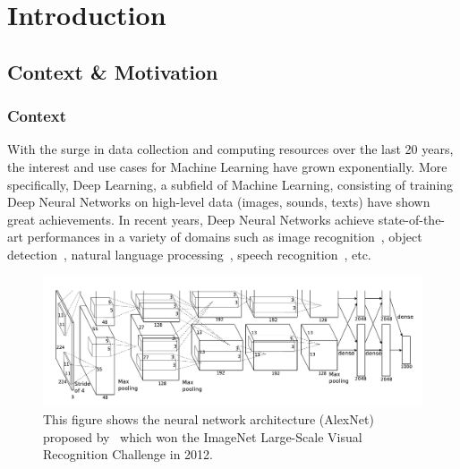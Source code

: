 \chapter{Introduction}
\label{chapter:introduction}
\localtableofcontents

\section{Context \& Motivation}
\label{section:ch1-context_and_motivation}

\subsection{Context}
\label{subsection:ch1-context}

With the surge in data collection and computing resources over the last 20 years, the interest and use cases for Machine Learning have grown exponentially.
More specifically, Deep Learning, a subfield of Machine Learning, consisting of training Deep Neural Networks on high-level
data (images, sounds, texts) have shown great achievements.
In recent years, Deep Neural Networks achieve state-of-the-art performances in a variety of domains such as image recognition~\cite{lecun1998gradient,krizhevsky2012imagenet,he2016deep,tan2019efficientnet}, object detection~\cite{redmon2016you,liu2016ssd,redmon2017yolo9000}, natural language processing~\cite{merity2016pointer,radford2018Language,brown2020language}, speech recognition~\cite{hinton2012deep,abdel2014convolutional,yu2016automatic}, etc.

\begin{figure}[t]
  \centering
  \includegraphics[scale=0.2]{figures/chapter1/alexnet.png}
  \caption{This figure shows the neural network architecture (AlexNet) proposed by~\citet{krizhevsky2012imagenet} which won the ImageNet Large-Scale Visual Recognition Challenge in 2012.}
  \label{figure:ch1-alexnet_network}
\end{figure}

